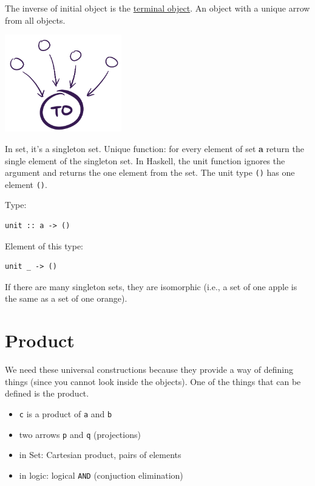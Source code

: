 \documentclass[11pt]{article}
\begin{document}
The inverse of initial object is the \href{https://en.wikipedia.org/wiki/Initial\_and\_terminal\_objects}{terminal object}. An object with a unique arrow from all objects.

\begin{center}
\includegraphics[width=2.0in]{./img/terminal_object.png}
\end{center}

In set, it's a singleton set. Unique function: for every element of set \textbf{a} return the single element of the singleton set. In Haskell, the unit function ignores the argument and returns the one element from the set. The unit type \texttt{()} has one element \texttt{()}.

Type:

\begin{verbatim}
unit :: a -> ()
\end{verbatim}

Element of this type:

\begin{verbatim}
unit _ -> ()
\end{verbatim}

If there are many singleton sets, they are isomorphic (i.e., a set of one apple is the same as a set of one orange).

\section{Product}
\label{sec:orgb10d3b5}

We need these universal constructions because they provide a way of defining things (since you cannot look inside the objects). One of the things that can be defined is the product.

\begin{itemize}
\item \texttt{c} is a product of \texttt{a} and \texttt{b}
\item two arrows \texttt{p} and \texttt{q} (projections)
\item in Set: Cartesian product, pairs of elements
\item in logic: logical \texttt{AND} (conjuction elimination)
\end{itemize}
\end{document}

